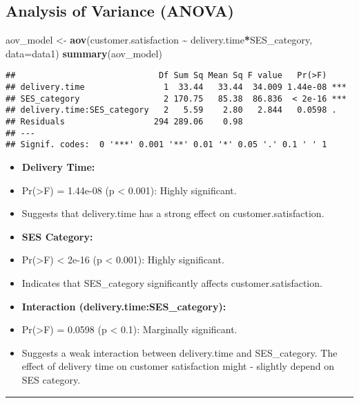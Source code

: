 \documentclass[
]{article}
\newenvironment{Shaded}{\begin{snugshade}}{\end{snugshade}}
\newcommand{\AttributeTok}[1]{\textcolor[rgb]{0.13,0.29,0.53}{#1}}
\newcommand{\FunctionTok}[1]{\textcolor[rgb]{0.13,0.29,0.53}{\textbf{#1}}}
\newcommand{\NormalTok}[1]{#1}
\newcommand{\OtherTok}[1]{\textcolor[rgb]{0.56,0.35,0.01}{#1}}
\newcommand{\SpecialCharTok}[1]{\textcolor[rgb]{0.81,0.36,0.00}{\textbf{#1}}}
\begin{document}
\subsection{Analysis of Variance
(ANOVA)}\label{analysis-of-variance-anova-2}

\begin{Shaded}
\begin{Highlighting}[]
\NormalTok{aov\_model }\OtherTok{\textless{}{-}} \FunctionTok{aov}\NormalTok{(customer.satisfaction }\SpecialCharTok{\textasciitilde{}}\NormalTok{ delivery.time}\SpecialCharTok{*}\NormalTok{SES\_category, }\AttributeTok{data=}\NormalTok{data1)}
\FunctionTok{summary}\NormalTok{(aov\_model)}
\end{Highlighting}
\end{Shaded}

\begin{verbatim}
##                             Df Sum Sq Mean Sq F value   Pr(>F)    
## delivery.time                1  33.44   33.44  34.009 1.44e-08 ***
## SES_category                 2 170.75   85.38  86.836  < 2e-16 ***
## delivery.time:SES_category   2   5.59    2.80   2.844   0.0598 .  
## Residuals                  294 289.06    0.98                     
## ---
## Signif. codes:  0 '***' 0.001 '**' 0.01 '*' 0.05 '.' 0.1 ' ' 1
\end{verbatim}

\begin{itemize}
\item
  \textbf{Delivery Time:}
\item
  Pr(\textgreater F) = 1.44e-08 (p \textless{} 0.001): Highly
  significant.
\item
  Suggests that delivery.time has a strong effect on
  customer.satisfaction.
\item
  \textbf{SES Category:}
\item
  Pr(\textgreater F) \textless{} 2e-16 (p \textless{} 0.001): Highly
  significant.
\item
  Indicates that SES\_category significantly affects
  customer.satisfaction.
\item
  \textbf{Interaction (delivery.time:SES\_category):}
\item
  Pr(\textgreater F) = 0.0598 (p \textless{} 0.1): Marginally
  significant.
\item
  Suggests a weak interaction between delivery.time and SES\_category.
  The effect of delivery time on customer satisfaction might - slightly
  depend on SES category.
\end{itemize}

\begin{center}\rule{0.5\linewidth}{0.5pt}\end{center}
\end{document}
